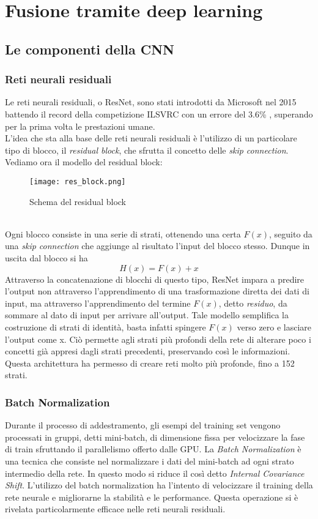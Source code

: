 \chapter{Fusione tramite deep learning}

\section{Le componenti della CNN}
\subsection{Reti neurali residuali}
Le reti neurali residuali, o ResNet, sono stati introdotti da Microsoft nel 2015 battendo il record della competizione ILSVRC con un errore del 3.6\% \cite{resnet}, superando per la prima volta le prestazioni umane.\\
L'idea che sta alla base delle reti neurali residuali è l'utilizzo di un particolare tipo di blocco, il \textit{residual block}, che sfrutta il concetto delle \textit{skip connection}. \\
Vediamo ora il modello del residual block:
\begin{figure}[ht]
    \centering
    \texttt{[image: res\_block.png]}
    \caption[Residual block]{Schema del residual block}
\end{figure}\\
Ogni blocco consiste in una serie di strati, ottenendo una certa $F(x)$, seguito da una \textit{skip connection} che aggiunge al risultato l'input del blocco stesso. Dunque in uscita dal blocco si ha
$$ H(x)=F(x)+x $$
Attraverso la concatenazione di blocchi di questo tipo, ResNet impara a predire l'output non attraverso l'apprendimento di una trasformazione diretta dei dati di input, ma attraverso l'apprendimento del termine $F(x)$, detto \textit{residuo}, da sommare al dato di input per arrivare all'output. Tale modello semplifica la costruzione di strati di identità, basta infatti spingere $F(x)$ verso zero e lasciare l'output come x. Ciò permette agli strati più profondi della rete di alterare poco i concetti già appresi dagli strati precedenti, preservando così le informazioni. Questa architettura ha permesso di creare reti molto più profonde, fino a 152 strati.

\subsection{Batch Normalization}
Durante il processo di addestramento, gli esempi del training set vengono processati in gruppi, detti mini-batch, di dimensione fissa per velocizzare la fase di train sfruttando il parallelismo offerto dalle GPU. La \textit{Batch Normalization} è una tecnica che consiste nel normalizzare i dati del mini-batch ad ogni strato intermedio della rete. In questo modo si riduce il così detto \textit{Internal Covariance Shift}. L'utilizzo del batch normalization ha l'intento di velocizzare il training della rete neurale e migliorarne la stabilità e le performance. Questa operazione si è rivelata particolarmente efficace nelle reti neurali residuali.

